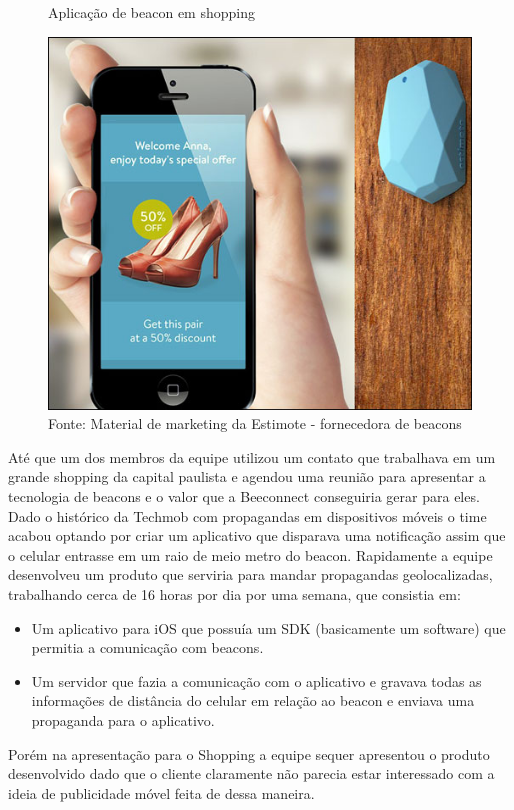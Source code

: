 \begin{figure}[H]
\caption{Aplicação de beacon em shopping}
\centerline{\includegraphics[scale=0.5]{img/beaconShopping}}
\label{fig:beaconShopping}
\caption* {Fonte: Material de marketing da Estimote - fornecedora de beacons}
\end{figure}

Até que um dos membros da equipe utilizou um contato que trabalhava em um grande shopping da capital paulista e agendou uma reunião para apresentar a tecnologia de beacons e o valor que a Beeconnect conseguiria gerar para eles. Dado o histórico da Techmob com propagandas em dispositivos móveis o time acabou optando por criar um aplicativo que disparava uma notificação assim que o celular entrasse em um raio de meio metro do beacon. Rapidamente a equipe desenvolveu  um produto que serviria para mandar propagandas geolocalizadas, trabalhando cerca de 16 horas por dia por uma semana, que consistia em:
\begin{itemize}
\item Um aplicativo para iOS que possuía um SDK (basicamente um software) que permitia a comunicação com beacons.
\item Um servidor que fazia a comunicação com o aplicativo e gravava todas as informações de distância do celular em relação ao beacon e enviava uma propaganda para o aplicativo.
\end{itemize}

Porém na apresentação para o Shopping a equipe sequer apresentou o produto desenvolvido dado que o cliente claramente não parecia estar interessado com a ideia de publicidade móvel feita de dessa maneira.

